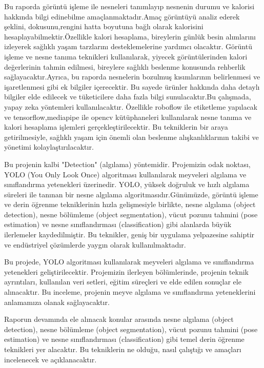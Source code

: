 \documentclass[11pt,a4paper]{report}
\begin{document}
    Bu raporda görüntü işleme ile nesneleri tanımlayıp nesnenin durumu ve kalorisi hakkında bilgi edinebilme amaçlanmaktadır.Amaç görüntüyü analiz ederek şeklini, dokusunu,rengini hatta boyutuna bağlı olarak kalorisini hesaplayabilmektir.Özellikle kalori hesaplama, bireylerin günlük besin alımlarını izleyerek sağlıklı yaşam tarzlarını desteklemelerine yardımcı olacaktır. Görüntü işleme ve nesne tanıma teknikleri kullanılarak, yiyecek görüntülerinden kalori değerlerinin tahmin edilmesi, bireylere sağlıklı beslenme konusunda rehberlik sağlayacaktır.Ayrıca, bu raporda nesnelerin bozulmuş kısımlarının belirlenmesi ve işaretlenmesi gibi ek bilgiler içerecektir. Bu sayede ürünler hakkında daha detaylı bilgiler elde edilecek ve tüketicilere daha fazla bilgi sunulacaktır.Bu çalışmada, yapay zeka yöntemleri kullanılacaktır. Özellikle roboflow ile etiketleme yapılacak ve tensorflow,mediapipe ile opencv kütüphaneleri kullanılarak nesne tanıma ve kalori hesaplama işlemleri gerçekleştirilecektir. Bu tekniklerin bir araya getirilmesiyle, sağlıklı yaşam için önemli olan beslenme alışkanlıklarının takibi ve yönetimi kolaylaştırılacaktır.
    \newline

    Bu projenin kalbi "Detection" (algılama) yöntemidir. Projemizin odak noktası, YOLO (You Only Look Once) algoritması kullanılarak meyveleri algılama ve sınıflandırma yetenekleri üzerinedir. YOLO, yüksek doğruluk ve hızlı algılama süreleri ile tanınan bir nesne algılama algoritmasıdır.Günümüzde, görüntü işleme ve derin öğrenme tekniklerinin hızla gelişmesiyle birlikte, nesne algılama (object detection), nesne bölümleme (object segmentation), vücut pozunu tahmini (pose estimation) ve nesne sınıflandırması (classification) gibi alanlarda büyük ilerlemeler kaydedilmiştir. Bu teknikler, geniş bir uygulama yelpazesine sahiptir ve endüstriyel çözümlerde yaygın olarak kullanılmaktadır.
    \newline

    Bu projede, YOLO algoritması kullanılarak meyveleri algılama ve sınıflandırma yetenekleri geliştirilecektir. Projemizin ilerleyen bölümlerinde, projenin teknik ayrıntıları, kullanılan veri setleri, eğitim süreçleri ve elde edilen sonuçlar ele alınacaktır. Bu inceleme, projenin meyve algılama ve sınıflandırma yeteneklerini anlamamıza olanak sağlayacaktır.

    Raporun devamında ele alınacak konular arasında nesne algılama (object detection), nesne bölümleme (object segmentation), vücut pozunu tahmini (pose estimation) ve nesne sınıflandırması (classification) gibi temel derin öğrenme teknikleri yer alacaktır. Bu tekniklerin ne olduğu, nasıl çalıştığı ve amaçları incelenecek ve açıklanacaktır.
    \newline
\end{document}

